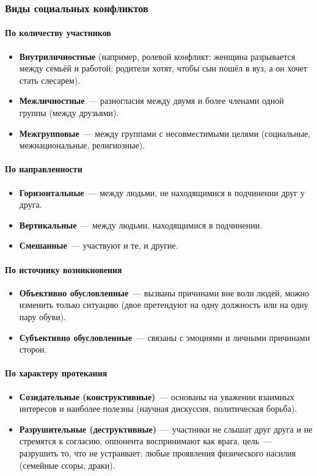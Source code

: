 \documentclass[12pt]{article}
\begin{document}
	\subsubsection{Виды социальных конфликтов}

	\paragraph{По количеству участников}
	\begin{itemize}
		\item \textbf{Внутриличностные} (например, ролевой конфликт: женщина разрывается между семьёй и работой; родители хотят, чтобы сын пошёл в вуз, а он хочет стать слесарем).
		\item \textbf{Межличностные}~--- разногласия между двумя и более членами одной группы (между друзьями).
		\item \textbf{Межгрупповые}~--- между группами с несовместимыми целями (социальные, межнациональные, религиозные).
	\end{itemize}

	\paragraph{По направленности}
	\begin{itemize}
		\item \textbf{Горизонтальные}~--- между людьми, не находящимися в подчинении друг у друга.
		\item \textbf{Вертикальные}~--- между людьми, находящимися в подчинении.
		\item \textbf{Смешанные}~--- участвуют и те, и другие.
	\end{itemize}

	\paragraph{По источнику возникновения}
	\begin{itemize}
		\item \textbf{Объективно обусловленные}~--- вызваны причинами вне воли людей, можно изменить только ситуацию (двое претендуют на одну должность или на одну пару обуви).
		\item \textbf{Субъективно обусловленные}~--- связаны с эмоциями и личными причинами сторон.
	\end{itemize}

	\paragraph{По характеру протекания}
	\begin{itemize}
		\item \textbf{Созидательные (конструктивные)}~--- основаны на уважении взаимных интересов и наиболее полезны (научная дискуссия, политическая борьба).
		\item \textbf{Разрушительные (деструктивные)}~--- участники не слышат друг друга и не стремятся к согласию, оппонента воспринимают как врага, цель~--- разрушить то, что не устраивает; любые проявления физического насилия (семейные ссоры, драки).
	\end{itemize}
\end{document}
